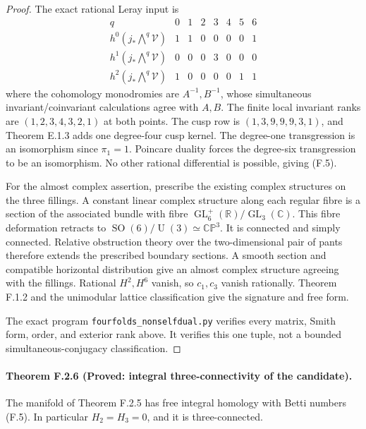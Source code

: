 \begin{proof}
The exact rational Leray input is
\[
\begin{array}{c|rrrrrrr}
q&0&1&2&3&4&5&6\\ \hline
h^0(j_*\bigwedge^q\mathcal V)&1&1&0&0&0&0&1\\
h^1(j_*\bigwedge^q\mathcal V)&0&0&0&3&0&0&0\\
h^2(j_*\bigwedge^q\mathcal V)&1&0&0&0&0&1&1
\end{array}
\]
where the cohomology monodromies are $A^{-1},B^{-1}$, whose
simultaneous invariant/coinvariant calculations agree with $A,B$.
The finite local invariant ranks are $(1,2,3,4,3,2,1)$ at both
points.  The cusp row is $(1,3,9,9,9,3,1)$, and Theorem E.1.3
adds one degree-four cusp kernel.  The degree-one transgression
is an isomorphism since $\pi_1=1$.  Poincare duality forces the
degree-six transgression to be an isomorphism.  No other rational
differential is possible, giving (F.5).

For the almost complex assertion, prescribe the existing complex
structures on the three fillings.  A constant linear complex
structure along each regular fibre is a section of the associated
bundle with fibre
$\operatorname{GL}_6^+(\mathbb R)/\operatorname{GL}_3(\mathbb C)$.
This fibre deformation retracts to
$\operatorname{SO}(6)/\operatorname{U}(3)\simeq\mathbb{CP}^3$.
It is connected and simply connected.  Relative obstruction
theory over the two-dimensional pair of pants therefore extends
the prescribed boundary sections.  A smooth section and compatible
horizontal distribution give an almost complex structure agreeing
with the fillings.  Rational $H^2,H^6$ vanish, so $c_1,c_3$
vanish rationally.  Theorem F.1.2 and the unimodular lattice
classification give the signature and free form.

The exact program \texttt{fourfolds\_nonselfdual.py} verifies every
matrix, Smith form, order, and exterior rank above.  It verifies
this one tuple, not a bounded simultaneous-conjugacy classification.
\end{proof}

\paragraph{Theorem F.2.6 (Proved: integral three-connectivity of the candidate).}
The manifold of Theorem F.2.5 has free integral homology with
Betti numbers (F.5).  In particular $H_2=H_3=0$, and it is
three-connected.

